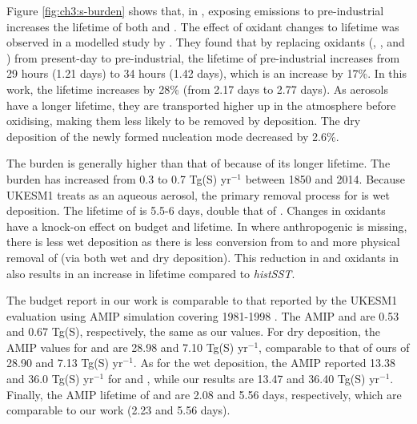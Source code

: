 Figure \ref{fig:ch3:s-burden} shows that, in \sstpio{}, exposing  emissions to pre-industrial  increases the lifetime of both  and . The effect of oxidant changes to  lifetime was observed in a modelled study by \citep{karsetStrongImpactsAerosol2018}. They found that by replacing oxidants (, ,  and ) from present-day to pre-industrial, the lifetime of pre-industrial  increases from 29 hours (1.21 days) to 34 hours (1.42 days), which is an increase by 17\%. In this work, the  lifetime increases by 28\% (from 2.17 days to 2.77 days). As aerosols have a longer lifetime, they are transported higher up in the atmosphere before oxidising, making them less likely to be removed by deposition. The dry deposition of the newly formed nucleation mode  decreased by 2.6\%. 

The  burden is generally higher than that of  because of its longer lifetime. The  burden has increased from 0.3 to 0.7 Tg(S) yr$^{-1}$ between 1850 and 2014. Because UKESM1 treats  as an aqueous aerosol, the primary removal process for  is wet deposition. The lifetime of  is 5.5-6 days, double that of . Changes in oxidants have a knock-on effect on  budget and lifetime. In \sstpio{} where anthropogenic  is missing, there is less  wet deposition as there is less conversion from  to  and more physical removal of  (via both wet and dry deposition). This reduction in  and oxidants in \sstpio{} also results in an increase in  lifetime compared to \textit{histSST}. 


The budget report in our work is comparable to that reported by the UKESM1 evaluation using AMIP simulation covering 1981-1998 \citep{mulcahyDescriptionEvaluationAerosol2020}. The AMIP  and  are 0.53 and 0.67 Tg(S), respectively, the same as our values. For dry deposition, the AMIP values for  and  are 28.98 and 7.10 Tg(S) yr$^{-1}$, comparable to that of ours of 28.90 and 7.13 Tg(S) yr$^{-1}$. As for the wet deposition, the AMIP reported 13.38 and 36.0 Tg(S) yr$^{-1}$ for  and , while our results are 13.47 and 36.40 Tg(S) yr$^{-1}$. Finally, the AMIP lifetime of  and  are 2.08 and 5.56 days, respectively, which are comparable to our work (2.23 and 5.56 days).  

